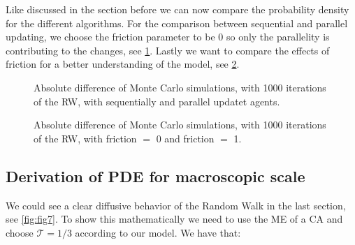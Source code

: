 Like discussed in the section before we can now compare the probability density for the different algorithms.
For the comparison between sequential and parallel updating, we choose the friction parameter to be 0 so only the parallelity is contributing to the changes, see \ref{fig:fig8}. 
Lastly we want to compare the effects of friction for a better understanding of the model, see \ref{fig:fig9}.
\begin{figure}
   \label{fig:fig8}
   \begin{center}
      
   \end{center}
   \caption{Absolute difference of Monte Carlo simulations, with 1000 iterations of the RW, with sequentially and parallel updatet agents.}
\end{figure}
\begin{figure}
   \label{fig:fig9}
   \begin{center}
      
   \end{center}
   \caption{Absolute difference of Monte Carlo simulations, with 1000 iterations of the RW, with friction $=$ 0 and friction $=$ 1.}
\end{figure}

\newpage
\subsection{Derivation of PDE for macroscopic scale}
We could see a clear diffusive behavior of the Random Walk in the last section, see \ref{fig:fig7}.
To show this mathematically we need to use the ME of a CA and choose $\mathcal{T} = 1/3$ according to our model.
We have that:

